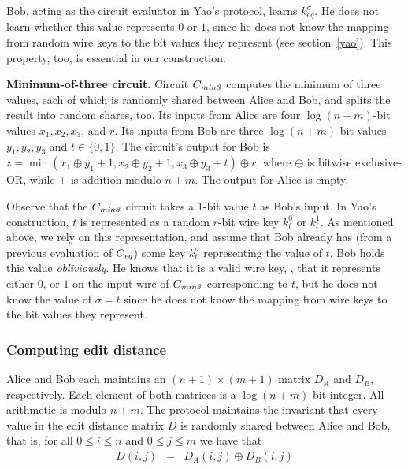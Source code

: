 Bob, acting as the circuit evaluator in Yao's protocol, learns
$k^{\sigma}_{\mathit{eq}}$.  He does not learn whether this value
represents $0$ or $1$, since he does not know the mapping from random
wire keys to the bit values they represent (see section~\ref{yao}).
This property, too, is essential in our construction.

\vspace{1ex}
\noindent
\textbf{Minimum-of-three circuit.}
Circuit $C_{\mathit{min3}}$ computes the minimum of three values, each of which is
randomly shared between Alice and Bob, and splits the result into random
shares, too.  Its inputs from Alice are four $\log(n+m)$-bit values
$x_1, x_2, x_3$, and $r$.  Its inputs from Bob are three $\log(n+m)$-bit
values $y_1, y_2, y_3$ and $t \in \{0,1\}$.  The circuit's output for
Bob is $z = \min(x_1 \oplus y_1 + 1, x_2 \oplus y_2+1, x_3 \oplus y_3+t)
\oplus r$, where $\oplus$ is bitwise exclusive-OR, while $+$ is addition
modulo $n+m$.  The output for Alice is empty.


Observe that the $C_{\mathit{min3}}$ circuit takes a 1-bit value $t$ as Bob's input.
In Yao's construction, $t$ is represented as a random $r$-bit wire key
$k^0_t$ or $k^1_t$.  As mentioned above, we rely on this representation,
and assume that Bob already has (from a previous evaluation of $C_{\mathit{eq}}$)
some key $k^{\sigma}_t$ representing the value of $t$.  Bob holds this
value \emph{obliviously}.  He knows that it is a valid wire key, \ie, that
it represents either $0$, or $1$ on the input wire of $C_{\mathit{min3}}$ corresponding
to $t$, but he does not know the value of $\sigma=t$ since he does not
know the mapping from wire keys to the bit values they represent.


\subsubsection{Computing edit distance}

Alice and Bob each maintains an $(n+1) \times (m+1)$ matrix $D_A$ and
$D_B$, respectively.  Each element of both matrices is a $\log(n+m)$-bit
integer.  All arithmetic is modulo $n+m$.
The protocol maintains the invariant that every value in the edit
distance matrix $D$ is randomly shared between Alice and Bob, that is,
for all $0 \leq i \leq n$ and $0 \leq j \leq m$ we have that
\begin{eqnarray*}
D(i,j) & = & D_A(i,j) \oplus D_B(i,j)
\end{eqnarray*}

